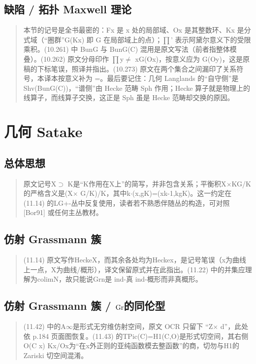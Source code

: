 \subsection*{缺陷 / 拓扑 Maxwell 理论}
\begin{quote}\small
本节的记号是全书最密的：Fx 是 x 处的局部域、Ox 是其整数环、Kx 是分式域（“圈群”G(Kx) 即 G 在局部域上的点）；$\prod$' 表示阿黛尔意义下的受限乘积。(10.261) 中 BunG 与 BunG(C) 混用是原文写法（前者指整体模叠）。(10.262) 原文分母印作 $\prod$y$\neq$ xG(Ox)，按意义应为 G(Oy)，这是原稿的下标笔误，照译并指出。(10.273) 原文在两个集合之间漏印了关系符号，本译本按意义补为 =。最后要记住：几何 Langlands 的“自守侧”是 Shv(BunG(C))，“谱侧”由 Hecke 范畴 Sph 作用；Hecke 算子就是物理上的线算子，而线算子交换，这正是 Sph 虽是 Hecke 范畴却交换的原因。
\end{quote}

\section{几何 Satake}
\subsection*{总体思想}
\begin{quote}\small
原文记号X$\supset$ K是“K作用在X上”的简写，并非包含关系；平衡积X$\times$KG/K的严格含义是(X$\times$ G/K)/K，其中k$\cdot$(x,gK)=(xk-1,kgK)。这一约定在 (11.14) 的LG+-丛中反复使用，读者若不熟悉伴随丛的构造，可对照 [Bor91] 或任何主丛教材。
\end{quote}

\subsection*{仿射 Grassmann 簇}
\begin{quote}\small
(11.14) 原文写作HeckeX，而其余各处均为Heckex，是记号笔误（x为曲线上一点，X为曲线/概形），译文保留原式并在此指出。(11.22) 中的并集应理解为colimN，故只能说Grn是 ind-真 ind-概形而非真概形。
\end{quote}

\subsection*{仿射 Grassmann 簇 / $\mathrm{Gr}$的同伦型}
\begin{quote}\small
(11.42) 中的A$\infty$是形式无穷维仿射空间，原文 OCR 只留下 “Z$\times$ d”，此处依 p.184 页面图恢复。(11.43) 的TPic(C)=H1(C,O)是形式切空间，其右侧O(C x) Kx/Ox为“在x外正则的亚纯函数模去整函数”的商，切勿与H1的 Zariski 切空间混淆。
\end{quote}

